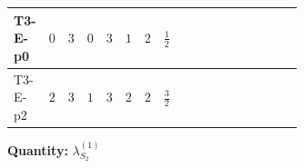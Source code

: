 \documentclass[8pt]{article}
\begin{document}
\begin{landscape}
\begin{longtable}{@{}llcccccc >{\raggedright\arraybackslash}p{0.21\linewidth} >{\raggedright\arraybackslash}p{0.21\linewidth} >{\raggedright\arraybackslash}p{0.21\linewidth}@{}}
\midrule
T3-E-p0 & $0$ & $3$ & $0$ & $3$ & $1$ & $2$ & $\frac{1}{2}$ & \scriptsize\adjustbox{max width=\linewidth}{$\begin{gathered} +12 {g_1}^4\end{gathered}$} & \scriptsize\adjustbox{max width=\linewidth}{$\begin{gathered} +6 {\lambda_{12}^{(1)}}^2\end{gathered}$} & \scriptsize\adjustbox{max width=\linewidth}{$\begin{gathered} +4 {\lambda_{HS_2}^{(1)}}^2\end{gathered}$} \\
\midrule
T3-E-p2 & $2$ & $3$ & $1$ & $3$ & $2$ & $2$ & $\frac{3}{2}$ & \scriptsize\adjustbox{max width=\linewidth}{$\begin{gathered} +192 {g_1}^4\end{gathered}$} & \scriptsize\adjustbox{max width=\linewidth}{$\begin{gathered} +6 {\lambda_{12}^{(1)}}^2\end{gathered}$} & \scriptsize\adjustbox{max width=\linewidth}{$\begin{gathered} +4 {\lambda_{HS_2}^{(1)}}^2\end{gathered}$} \\
\midrule
\bottomrule
\end{longtable}
\clearpage
\noindent\textbf{Quantity: }$\lambda_{S_2}^{(1)}$\par\smallskip

\end{landscape}
\end{document}
